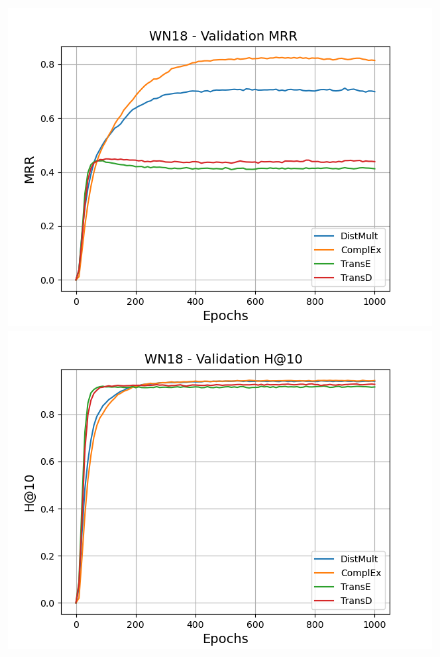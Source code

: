 \begin{figure}[H]
    \centering
    \begin{minipage}{.3\textwidth}
      \centering
      \includegraphics[width=\linewidth]{figures/results/pretrain/wn18/pretrain_wn18_mrrs.png}
    \end{minipage}%
    \begin{minipage}{.3\textwidth}
      \centering
      \includegraphics[width=\linewidth]{figures/results/pretrain/wn18/pretrain_wn18_hit10.png}
    \end{minipage}
    \begin{minipage}{.3\textwidth}
      \centering

\end{minipage}
\end{figure}
